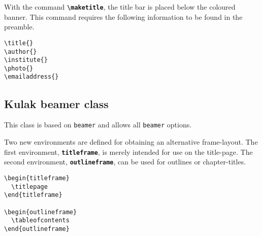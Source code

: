 \documentclass[kulak]{kulakarticle} %
\begin{document}
With the command \textbf{\texttt{\textbackslash maketitle}}, the title bar is placed below the coloured banner. This command requires the following information to be found in the preamble.

\begin{description}
\item[\texttt{\textbackslash title\{\}}]
\item[\texttt{\textbackslash author\{\}}]
\item[\texttt{\textbackslash institute\{\}}]
\item[\texttt{\textbackslash photo\{\}}]
\item[\texttt{\textbackslash emailaddress\{\}}]
\end{description}

\subsection{Kulak beamer class}

This class is based on \texttt{beamer} and allows all \texttt{beamer} options. 

Two new environments are defined for obtaining an alternative frame-layout. The first environment, \textbf{\texttt{titleframe}}, is merely intended for use on the title-page. The second environment, \textbf{\texttt{outlineframe}}, can be used for outlines or chapter-titles.

\begin{verbatim}
\begin{titleframe}
  \titlepage
\end{titleframe}

\begin{outlineframe}
  \tableofcontents
\end{outlineframe}
\end{verbatim}

%
%
%
\end{document}
